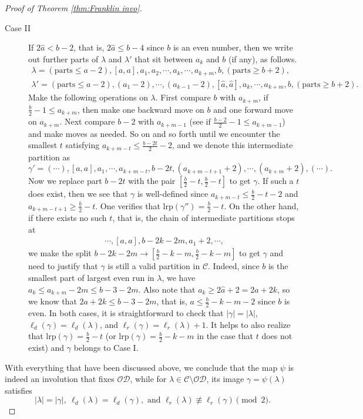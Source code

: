 \documentclass[11pt,reqno]{amsart}
\numberwithin{equation}{section}
\theoremstyle{plain}
\theoremstyle{definition}
\newcommand{\abs}[1]{\left|#1\right|}
\def\la{\lambda}
\def\C{\mathcal{C}}
\def\O{\mathcal{O}}
\def\gam{\gamma}
\newcommand{\D}{\mathcal{D}}
\def\lrp{\mathrm{lrp}}
\begin{document}
\begin{proof}[Proof of Theorem \ref{thm:Franklin invo}]
\begin{description}
\item[Case II] If $2\hat{a}< b-2$, that is, $2\hat{a}\leq b-4$ since $b$ is an even number, then we write out further parts of $\la$ and $\la'$ that sit between $a_k$ and $b$ (if any), as follows.
\begin{align*}
\lambda=(\text{parts}\leq a-2), [a, a], a_{1}, a_{2}, \cdots, a_{k}, \cdots, a_{k+m}, b, (\text{parts}\geq b+2),\\
\lambda'=(\text{parts}\leq a-2), (a_{1}-2), \cdots, (a_{k-1}-2), [\hat{a}, \hat{a}], a_{k},\cdots, a_{k+m}, b, (\text{parts}\geq b+2).
\end{align*}
Make the following operations on $\la$. First compare $b$ with $a_{k+m}$, if $\frac{b}{2}-1\leq a_{k+m}$, then make one backward move on $b$ and one forward move on $a_{k+m}$. Next compare $b-2$ with $a_{k+m-1}$ (see if $\frac{b-2}{2}-1\le a_{k+m-1}$) and make moves as needed. So on and so forth until we encounter the smallest $t$ satisfying $a_{k+m-t}\leq\frac{b-2t}{2}-2$, and we denote this intermediate partition as
$$
\gam'=(\cdots), [a, a], a_{1}, \cdots, a_{k+m-t}, b-2t, (a_{k+m-t+1}+2), \cdots, (a_{k+m}+2), (\cdots).
$$
Now we replace part $b-2t$ with the pair $[\frac{b}{2}-t, \frac{b}{2}-t]$ to get $\gam$. If such a $t$ does exist, then we see that $\gam$ is well-defined since $a_{k+m-t}\leq \frac{b}{2}-t-2$ and $a_{k+m-t+1}\geq \frac{b}{2}-t$. One verifies that $\lrp(\gam'')=\frac{b}{2}-t$. On the other hand, if there exists no such $t$, that is, the chain of intermediate partitions stops at
\begin{align*}
\cdots, [a, a], b-2k-2m, a_{1}+2, \cdots,
\end{align*}
we make the split $b-2k-2m\to[\frac{b}{2}-k-m,\frac{b}{2}-k-m]$ to get $\gam$ and need to justify that $\gam$ is still a valid partition in $\C$. Indeed, since $b$ is the smallest part of largest even run in $\la$, we have
$a_{k}\le a_{k+m}-2m\le b-3-2m$. Also note that $a_{k}\geq 2\hat{a}+2=2a+2k$, so we know that $2a+2k\leq b-3-2m$, that is, $a\leq \frac{b}{2}-k-m-2$ since $b$ is even. In both cases, it is straightforward to check that $\abs{\gam}=\abs{\la}$, $\ell_d(\gam)=\ell_d(\la)$, and $\ell_r(\gam)=\ell_r(\la)+1$. It helps to also realize that $\lrp(\gam)=\frac{b}{2}-t$ (or $\lrp(\gam)=\frac{b}{2}-k-m$ in the case that $t$ does not exist) and $\gam$ belongs to Case I.
\end{description}









With everything that have been discussed above, we conclude that the map $\psi$ is indeed an involution that fixes $\O\D$, while for $\la\in\C\setminus\O\D$, its image $\gam=\psi(\la)$ satisfies
$$|\la|=|\gam|,~\ell_d(\la)=\ell_d(\gamma), \text{ and } \ell_r(\la)\not\equiv\ell_r(\gamma)\pmod 2.$$


\end{proof}
\end{document}
